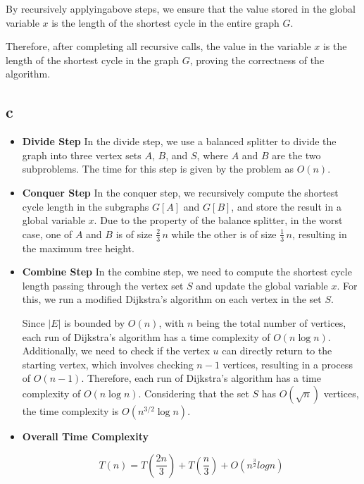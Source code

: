 \documentclass[12pt]{article}
\begin{document}
        By recursively applyingabove steps, we ensure that the value stored in the global variable \( x \) is the length of the shortest cycle in the entire graph \( G \).

        Therefore, after completing all recursive calls, the value in the variable \( x \) is the length of the shortest cycle in the graph \( G \), proving the correctness of the algorithm.

    \subsection*{c}
        \begin{itemize}

        \item \textbf{Divide Step}
        In the divide step, we use a balanced splitter to divide the graph into three vertex sets $A$, $B$, and $S$, where $A$ and $B$ are the two subproblems. The time for this step is given by the problem as $O(n)$.

        \item \textbf{Conquer Step}
        In the conquer step, we recursively compute the shortest cycle length in the subgraphs $G[A]$ and $G[B]$, and store the result in a global variable $x$. Due to the property of the balance splitter, in the worst case, one of \( A \) and \( B \) is of size \( \frac{2}{3} \, n \) while the other is of size \( \frac{1}{3} \, n \), resulting in the maximum tree height.

        \item \textbf{Combine Step}
        In the combine step, we need to compute the shortest cycle length passing through the vertex set $S$ and update the global variable $x$. For this, we run a modified Dijkstra's algorithm on each vertex in the set $S$.

        Since $|E|$ is bounded by $O(n)$, with $n$ being the total number of vertices, each run of Dijkstra's algorithm has a time complexity of $O(n \log n)$. Additionally, we need to check if the vertex \(u\) can directly return to the starting vertex, which involves checking \(n-1\) vertices, resulting in a process of $O(n-1)$. Therefore, each run of Dijkstra's algorithm has a time complexity of $O(n \log n)$. Considering that the set $S$ has $O(\sqrt{n})$ vertices, the time complexity is $O(n^{3/2} \log n)$.

        \item \textbf{Overall Time Complexity}

        \[
        T(n) = T(\frac{2n}{3}) +  T(\frac{n}{3}) + O(n^{\frac{3}{2}} log n)
        \]

    \end{itemize}

        
\end{document}
